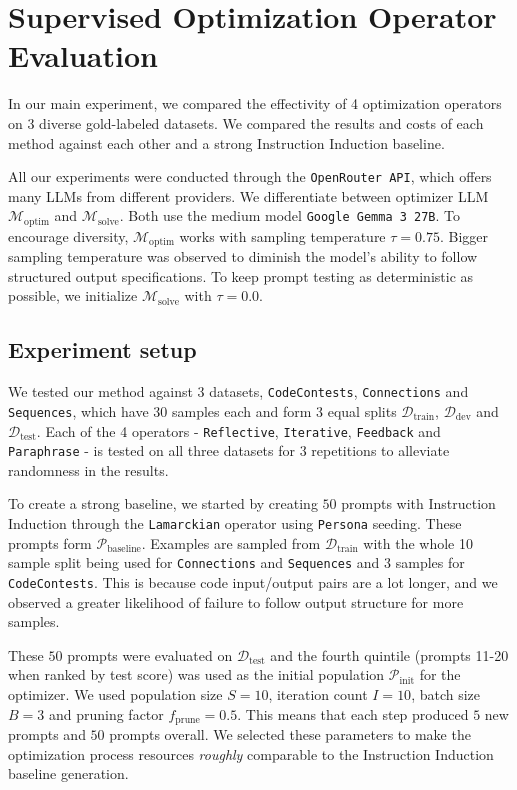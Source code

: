 \section{Supervised Optimization Operator Evaluation}
In our main experiment, we compared the effectivity of 4 optimization operators on 3 diverse gold-labeled datasets.
We compared the results and costs of each method against each other and a strong Instruction Induction baseline.

All our experiments were conducted through the \texttt{OpenRouter API}, which offers many LLMs from different providers.
We differentiate between optimizer LLM $\mathscr{M}_{\text{optim}}$ and $\mathscr{M}_{\text{solve}}$.
Both use the medium model \texttt{Google Gemma 3 27B}\cite{gemmateam2025gemma3technicalreport}. 
To encourage diversity, $\mathscr{M}_{\text{optim}}$ works with sampling temperature $\tau = 0.75$. 
Bigger sampling temperature was observed to diminish the model's ability to follow structured output specifications.
To keep prompt testing as deterministic as possible, we initialize $\mathscr{M}_{\text{solve}}$ with $\tau = 0.0$.


\subsection{Experiment setup}
We tested our method against 3 datasets, \texttt{CodeContests}, \texttt{Connections}  and \texttt{Sequences}, which have 30 samples each 
and form 3 equal splits $\mathcal{D}_{\text{train}}$, $\mathcal{D}_{\text{dev}}$ and $\mathcal{D}_{\text{test}}$. Each of the 4 operators - \texttt{Reflective}, \texttt{Iterative}, \texttt{Feedback} and \texttt{Paraphrase} - is tested on all three datasets for 3 repetitions
to alleviate randomness in the results.

To create a strong baseline, we started by creating $50$ prompts with Instruction Induction through the \texttt{Lamarckian} operator 
using \texttt{Persona}\cite{ge2024scalingsyntheticdatacreation} seeding. These prompts form $\mathscr{P}_{\text{baseline}}$. Examples are sampled from $\mathcal{D}_{\text{train}}$ with the whole 10 sample split being used for \texttt{Connections} and \texttt{Sequences}
and 3 samples for \texttt{CodeContests}. This is because code input/output pairs are a lot longer, and we observed a greater likelihood of failure to follow output structure for more samples.

These $50$ prompts were evaluated on $\mathcal{D}_{\text{test}}$ and the fourth quintile (prompts 11-20 when ranked by test score) was used as the initial population $\mathscr{P}_{\text{init}}$ for the optimizer.
We used population size $S=10$, iteration count $I=10$, batch size $B=3$ and pruning factor $f_{\text{prune}} = 0.5$. This means that each step produced $5$ new prompts and $50$ prompts overall.
We selected these parameters to make the optimization process resources \textit{roughly} comparable to the Instruction Induction baseline generation.


